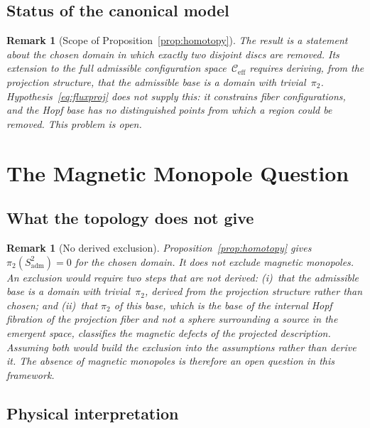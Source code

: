 \documentclass[11pt,a4paper]{article}
\newtheorem{remark}[theorem]{Remark}
\newcommand{\Ceff}{\mathcal{C}_{\mathrm{eff}}}
\begin{document}
    \subsection{Status of the canonical model}

      \begin{remark}[Scope of Proposition~\ref{prop:homotopy}]
        \label{rem:scope}
        The result is a statement about the chosen domain in which exactly
        two disjoint discs are removed.
        Its extension to the full admissible configuration space~$\Ceff$
        requires deriving, from the projection structure, that the admissible
        base is a domain with trivial~$\pi_2$.
        Hypothesis~\eqref{eq:fluxproj} does not supply this: it constrains
        fiber configurations, and the Hopf base has no distinguished points
        from which a region could be removed.
        This problem is open.
      \end{remark}

  \section{The Magnetic Monopole Question}
    \label{sec:monopoles}

    \subsection{What the topology does not give}

      \begin{remark}[No derived exclusion]
        \label{cor:nomonopole}
        Proposition~\ref{prop:homotopy} gives $\pi_2(S^2_{\mathrm{adm}}) = 0$
        for the chosen domain.
        It does not exclude magnetic monopoles.
        An exclusion would require two steps that are not derived:
        (i)~that the admissible base is a domain with trivial~$\pi_2$,
        derived from the projection structure rather than chosen; and
        (ii)~that $\pi_2$ of this base, which is the base of the internal
        Hopf fibration of the projection fiber and not a sphere surrounding a
        source in the emergent space, classifies the magnetic defects of the
        projected description.
        Assuming both would build the exclusion into the assumptions rather
        than derive it.
        The absence of magnetic monopoles is therefore an open question in
        this framework.
      \end{remark}

    \subsection{Physical interpretation}
\end{document}

